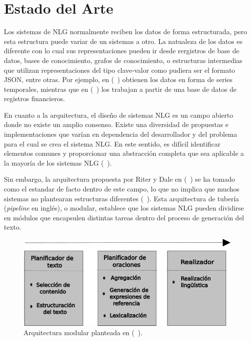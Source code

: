 \chapter{Estado del Arte}\label{chapter:state-of-the-art}


    Los sistemas de NLG normalmente reciben los datos de forma estructurada, pero esta estructura puede variar de un sistemas a otro.
La natualeza de los datos es diferente con lo cual sus representaciones pueden ir desde rergistros de base de datos, bases de conocimiento, 
grafos de conocimiento, o estructuras intermedias que utilizan representaciones del tipo clave-valor como pudiera ser el formato JSON, entre otras. 
Por ejemplo, en (~\cite{Yu2006ChoosingTC}) obtienen los datos en forma de series temporales, mientras que en (~\cite{kukich1983design}) los trabajan a 
partir de una base de datos de registros financieros.

En cuanto a la arquitectura, el diseño de sistemas NLG es un campo abierto donde no existe un amplio consenso. Existe una diversidad de propuestas e implementaciones 
que varían en dependencia del desarrollador y del problema para el cual se crea el sistema NLG. En este sentido, es difícil identificar elementos comunes y proporcionar una abstracción 
completa que sea aplicable a la mayoría de los sistemas NLG (~\cite{ramos2016role}).


 Sin embargo, la arquitectura propuesta por Riter y Dale en (~\cite{Reiter1997BuildingAN}) se ha tomado como el estandar de facto 
dentro de este campo, lo que no implica que muchos sistemas no plantearan estructuras diferentes (~\cite{Perera2017RecentAI}). 
Esta arquitectura de tubería (\emph{pipeline} en inglés), o modular, establece que los sistemas NLG pueden dividirse en módulos 
que encapsulen distintas tareas dentro del proceso de generación del texto.

    

    \begin{figure}[!]
        \begin{center}
            \includegraphics[width=\textwidth]{Graphics/arquitecturaPipeline_Capa 1.png}
        \end{center}
        \caption{Arquitectura modular planteada en (~\cite{Reiter1997BuildingAN}).}
        \label{fig_arq_Pipeline}
    \end{figure}


